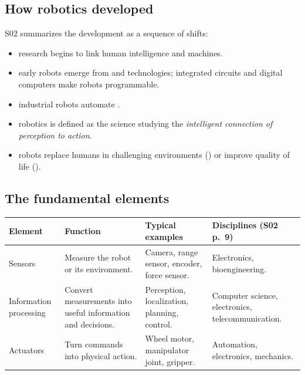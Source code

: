 \subsection{How robotics developed}
S02 summarizes the development as a sequence of shifts:
\begin{itemize}
\item {} research begins to link human intelligence and machines.
\item {} early robots emerge from  and  technologies; integrated circuits and digital computers make robots programmable.
\item {} industrial robots automate .
\item {} robotics is defined as the science studying the \emph{intelligent connection of perception to action}.
\item {} robots replace humans in challenging environments () or improve quality of life ().
\end{itemize}


\subsection{The fundamental elements}
\par\smallskip\begin{tabularx}{\linewidth}{@{}L{25mm}YYL{36mm}@{}}
\toprule
Element & Function & Typical examples & Disciplines (S02 p.~9) \\
\midrule
Sensors & Measure the robot or its environment. & Camera, range sensor, encoder, force sensor. & Electronics, bioengineering. \\
Information processing & Convert measurements into useful information and decisions. & Perception, localization, planning, control. & Computer science, electronics, telecommunication. \\
Actuators & Turn commands into physical action. & Wheel motor, manipulator joint, gripper. & Automation, electronics, mechanics. \\
\bottomrule
\end{tabularx}\par\smallskip

